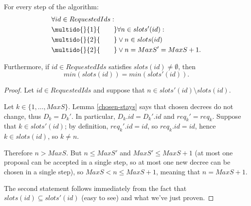 \documentclass[12pt,a4paper,en]{pracamgr}
\newcommand{\ind}[1]{\multido{}{#1}{\qquad}}
\begin{document}
\begin{lemma}\label{id-incr-slots}
    For every step of the algorithm:
    \begin{align*}
        & \forall id \in RequestedIds:\\
        & \ind{1} \forall n \in slots'(id):\\
        & \ind{2} \lor n \in slots(id)\\
        & \ind{2} \lor n = MaxS' = MaxS + 1.
    \end{align*}

    Furthermore, if $id \in RequestedIds$ satisfies $slots(id) \neq \emptyset$, then
    $$ min(slots(id)) = min(slots'(id)). $$
\end{lemma}
\begin{proof}
    Let $id \in RequestedIds$ and suppose that $n \in slots'(id) \setminus slots(id)$.

    Let $k \in \{1, \dots, MaxS\}$. Lemma \ref{chosen-stays} says that chosen decrees do not change, thus $D_k = D_k'$. In particular, $D_k.id = D_k'.id$ and $req_k' = req_k$. Suppose that $k \in slots'(id)$; by definition, $req_k'.id = id$, so $req_k.id = id$, hence $k \in slots(id)$, so $k \neq n$.

    Therefore $n > MaxS$. But $n \le MaxS'$ and $MaxS' \le MaxS + 1$ (at most one proposal can be accepted in a single step, so at most one new decree can be chosen in a single step), so $MaxS < n \le MaxS + 1$, meaning that $n = MaxS + 1$.

    The second statement follows immediately from the fact that $slots(id) \subseteq slots'(id)$ (easy to see) and what we've just proven.
\end{proof}
\end{document}

